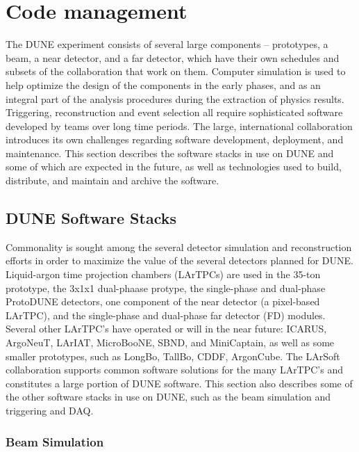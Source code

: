%

\chapter{Code management} %
The DUNE experiment consists of several large components -- prototypes, a beam, a near detector, and a far detector,
which have their own schedules and subsets of the collaboration that work on them.  Computer simulation is used to
help optimize the design of the components in the early phases, and as an integral part of the analysis procedures
during the extraction of physics results.  Triggering, reconstruction and event selection all require sophisticated
software developed by teams over long time periods.  The large, international
collaboration introduces its own challenges regarding software development, deployment, and maintenance.
This section describes the software stacks in use on DUNE and some of which are expected in the future,
as well as technologies used to build, distribute, and maintain and archive the software.

\section{DUNE Software Stacks}

Commonality is sought among the several detector simulation and reconstruction efforts in order to maximize the
value of the several detectors planned for DUNE.  Liquid-argon time projection chambers (LArTPCs) are used in the 35-ton
prototype, the 3x1x1 dual-phaase protype, the single-phase and dual-phase ProtoDUNE detectors, 
one component of the near detector (a pixel-based
LArTPC), and the single-phase and dual-phase far detector (FD) modules.  Several other LArTPC's have operated or will
in the near future:  ICARUS, ArgoNeuT, LArIAT, MicroBooNE, SBND, and MiniCaptain, as well as some smaller prototypes,
such as LongBo, TallBo, CDDF, ArgonCube.  The LArSoft collaboration supports common software solutions for the
many LArTPC's and constitutes a large portion of DUNE software.  This section also describes some of the other
software stacks in use on DUNE, such as the beam simulation and triggering and DAQ.

\subsection{Beam Simulation}

